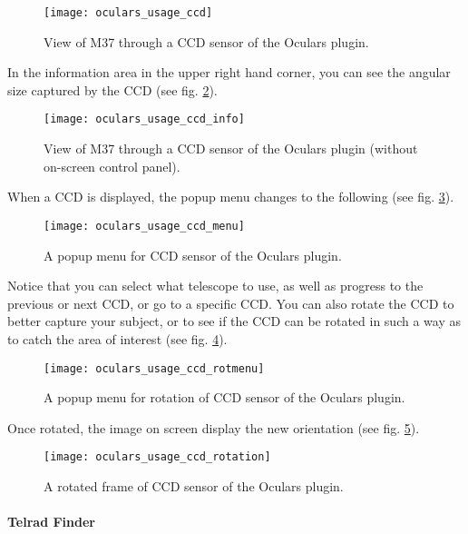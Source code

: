 \begin{figure}[ht]\centering
\texttt{[image: oculars\_usage\_ccd]}
\caption{View of M37 through a CCD sensor of the Oculars plugin.}
\label{fig:plugins:Oculars:Usage:CCD}
\end{figure}

In the information area in the upper right hand corner, you can see the angular size captured by the CCD (see fig. \ref{fig:plugins:Oculars:Usage:CCD:Info}).

\begin{figure}[ht]\centering
\texttt{[image: oculars\_usage\_ccd\_info]}
\caption{View of M37 through a CCD sensor of the Oculars plugin (without on-screen control panel).}
\label{fig:plugins:Oculars:Usage:CCD:Info}
\end{figure}

When a CCD is displayed, the popup menu changes to the following (see fig. \ref{fig:plugins:Oculars:Usage:CCD:Menu}).

\begin{figure}[ht]\centering
\texttt{[image: oculars\_usage\_ccd\_menu]}
\caption{A popup menu for CCD sensor of the Oculars plugin.}
\label{fig:plugins:Oculars:Usage:CCD:Menu}
\end{figure}

Notice that you can select what telescope to use, as well as progress to the previous or next CCD, or go to a specific CCD. You can also rotate the CCD to better capture your subject, or to see if the CCD can be rotated in such a way as to catch the area of interest (see fig. \ref{fig:plugins:Oculars:Usage:CCD:RotMenu}).

\begin{figure}[ht]\centering
\texttt{[image: oculars\_usage\_ccd\_rotmenu]}
\caption{A popup menu for rotation of CCD sensor of the Oculars plugin.}
\label{fig:plugins:Oculars:Usage:CCD:RotMenu}
\end{figure}

Once rotated, the image on screen display the new orientation (see fig. \ref{fig:plugins:Oculars:Usage:CCD:Rotation}).

\begin{figure}[ht]\centering
\texttt{[image: oculars\_usage\_ccd\_rotation]}
\caption{A rotated frame of CCD sensor of the Oculars plugin.}
\label{fig:plugins:Oculars:Usage:CCD:Rotation}
\end{figure}

\paragraph{Telrad Finder}

